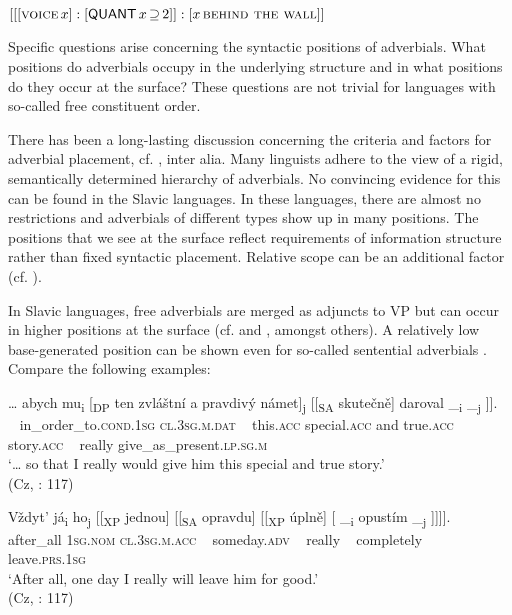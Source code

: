 \documentclass[output=paper]{langscibook}
\begin{document}
  \ex ${[[[\textsc{voice} \, x] : [\cnstx{quant} \, x \, {\supseteq} \, 2]] : [x \, \textsc{behind the wall}]]}$
  \z
\z

\noindent Specific questions arise concerning the syntactic positions of adverbials. What positions do adverbials occupy in the underlying structure and in what positions do they occur at the surface? These questions are not trivial for languages with so-called free constituent order.

There has been a long-lasting discussion concerning the criteria and factors for adverbial placement, cf. \citet{Steinitz1969,maienborn1996situation,Alexiadou1997,Frey2003,FreyPittner1999,Cinque1999,Cinque2004}, inter alia. Many linguists adhere to the view of a rigid, semantically determined hierarchy of adverbials. No convincing evidence for this can be found in the Slavic languages. In these languages, there are almost no restrictions and adverbials of different types show up in many positions. The positions that we see at the surface reflect requirements of information structure rather than fixed syntactic placement. Relative scope can be an additional factor (cf. \citealt{Junghanns2002,Junghanns2006,Szucsich2002,Werkmann2003,Biskup2011}).

In Slavic languages, free adverbials are merged as adjuncts to VP but can occur in higher positions at the surface (cf. \citealt{Junghanns2002} and \citealt{Werkmann2003}, amongst others). A relatively low base-generated position can be shown even for so-called sentential adverbials  \citep[116--117]{Junghanns2006}. Compare the following examples:

\ea%
    \label{ex:junghanns:40}
  \ea \gll   … abych                           mu\textsubscript{i} [\textsubscript{DP} ten zvláštní a pravdivý námet]\textsubscript{j} [[\textsubscript{SA} skutečně] \minsp{[} daroval \_\textsubscript{i} \_\textsubscript{j} ]].\\
             ~ in\_order\_to.\textsc{cond.1sg} \textsc{cl.3sg.m.dat}   ~ this.\textsc{acc} special.\textsc{acc} and true.\textsc{acc} story.\textsc{acc} ~ really  {} give\_as\_present.\textsc{lp.sg.m}\\
    \glt ‘… so that I really would give him this special and true story.’ \\ \hfill(Cz, \citealt{Junghanns2006}: 117)

  \ex \gll   Vždyt’ já\textsubscript{i} ho\textsubscript{j} [[\textsubscript{XP} jednou] [[\textsubscript{SA} opravdu] [[\textsubscript{XP} úplně] [ \_\textsubscript{i} opustím \_\textsubscript{j} ]]]].\\
    after\_all \textsc{1sg.nom} \textsc{cl.3sg.m.acc} ~ someday.\textsc{adv} ~ really ~ completely ~ ~ leave.\textsc{prs.1sg}\\
    \glt ‘After all, one day I really will leave him for good.’ \\ \hfill (Cz, \citealt{Junghanns2006}: 117)
\z
\z
\end{document}
